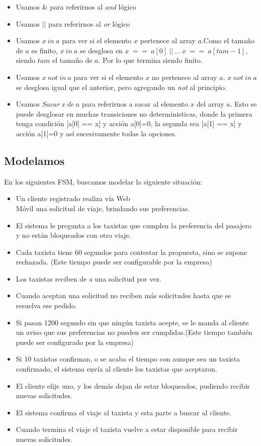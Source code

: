 \documentclass[a4paper, 10pt, twoside]{article}
\begin{document}
\begin{itemize}
	\item Usamos $\&$ para referirnos al \emph{and} lógico
	\item Usamos $||$ para referirnos al \emph{or} lógico
	\item Usamos $x\ in\ a$ para ver si el elemento $x$ pertenece al array $a$.Como el tamaño de $a$ es finito, $x\ in\ a$ se desglosa en $x\ ==\ a[0]\ ||\ ... \ x\ ==\ a[tam-1]$, siendo $tam$ el tamaño de $a$. Por lo que termina siendo finito.
	\item Usamos $x\ not\ in\ a$ para ver si el elemento $x$ no pertenece al array $a$. $x\ not\ in\ a$ se desglosa igual que el anterior, pero agregando un \emph{not} al principio. 
	\item Usamos $Sacar\ x\ de\ a$ para referirnos a sacar al elemento $x$ del array $a$. Esto se puede desglosar en muchas transiciones no deterministicas, donde la primera tenga condición [a[0] == x] y acci\'on {a[0]=0}, la segunda sea [a[1] == x] y acci\'on {a[1]=0} y as\'i sucesivamente todas la opciones.
	

\end{itemize}

\subsection{Modelamos}

En los siguientes FSM, buscamos modelar la siguiente situaci\'on:
\begin{itemize}
 \item Un cliente registrado realiza v\'ia Web\\M\'ovil una solicitud de viaje, brindando sus preferencias.
 \item El sistema le pregunta a los taxistas que cumplen la preferencia del pasajero y no est\'an bloqueados con otro viaje.
 \item Cada taxista tiene 60 segundos para contestar la propuesta, sino se supone rechazada. (Este tiempo puede ser configurable por la empresa)
 \item Los taxistas reciben de a una solicitud por vez.
 \item Cuando aceptan una solicitud no reciben m\'as solicitudes hasta que se resuelva ese pedido.
 \item Si pasan 1200 segundo sin que ning\'un taxista acepte, se le manda al cliente un aviso que sus preferencias no pueden ser cumplidas.(Este tiempo tambi\'en puede ser configurado por la empresa)
 \item Si 10 taxistas confirman, o se acaba el tiempo con aunque sea un taxista confirmado, el sistema env\'ia al cliente los taxistas que aceptaron.
 \item El cliente elije uno, y los dem\'as dejan de estar bloqueados, pudiendo recibir nuevas solicitudes.
 \item El sistema confirma el viaje al taxista y esta parte a buscar al cliente.
 \item Cuando termina el viaje el taxista vuelve a estar disponible para recibir nuevas solicitudes.
\end{itemize}
\end{document}
